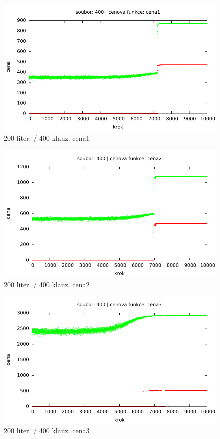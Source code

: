 \documentclass[12pt,a4paper]{article}
\begin{document}
\begin{figure}[H]
	\caption{200 liter. / 400 klauz. cena1}
 	\centerline{\includegraphics{"../results/400cost1"}}
\end{figure}
\begin{figure}[H]
	\caption{200 liter. / 400 klauz. cena2}
 	\centerline{\includegraphics{"../results/400cost2"}}
\end{figure}
\begin{figure}[H]
	\caption{200 liter. / 400 klauz. cena3}
 	\centerline{\includegraphics{"../results/400cost3"}}
\end{figure}
\end{document}
